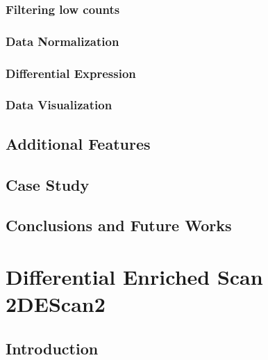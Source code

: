 \documentclass[b5paper,oneside,british,intoc,bibliograph=totoc,index=totoc,BCOR10mm,twoside,openright]{book}
\numberwithin{equation}{section}
\numberwithin{figure}{section}
\begin{document}
\subsection{Filtering low counts} \label{sec:ticorserfiltering}


\subsection{Data Normalization} \label{sec:ticorsernormalization}


\subsection{Differential Expression} \label{sec:ticorsermethods}


\subsection{Data Visualization} \label{sec:ticorserplots}


\section{Additional Features} \label{sec:ticorseraddfeat}


\section{Case Study} \label{sec:ticorseresults}


\section{Conclusions and Future Works} \label{sec:ticorseconclusions}


\chapter{Differential Enriched Scan 2\newline DEScan2} \label{sec:descan2cap}


\section{Introduction} \label{sec:descan2intro}

\end{document}
